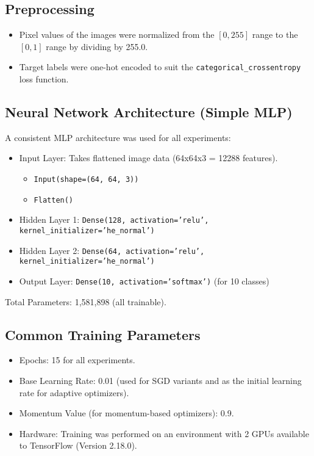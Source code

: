 \documentclass[11pt,a4paper]{article}
\begin{document}
\subsection{Preprocessing}
\begin{itemize}
    \item Pixel values of the images were normalized from the $[0, 255]$ range to the $[0, 1]$ range by dividing by 255.0.
    \item Target labels were one-hot encoded to suit the \texttt{categorical\_crossentropy} loss function.
\end{itemize}

\subsection{Neural Network Architecture (Simple MLP)}
A consistent MLP architecture was used for all experiments:
\begin{itemize}
    \item Input Layer: Takes flattened image data (64x64x3 = 12288 features).
        \begin{itemize}
            \item \texttt{Input(shape=(64, 64, 3))}
            \item \texttt{Flatten()}
        \end{itemize}
    \item Hidden Layer 1: \texttt{Dense(128, activation='relu', kernel\_initializer='he\_normal')}
    \item Hidden Layer 2: \texttt{Dense(64, activation='relu', kernel\_initializer='he\_normal')}
    \item Output Layer: \texttt{Dense(10, activation='softmax')} (for 10 classes)
\end{itemize}
Total Parameters: 1,581,898 (all trainable).

\subsection{Common Training Parameters}
\begin{itemize}
    \item Epochs: 15 for all experiments.
    \item Base Learning Rate: 0.01 (used for SGD variants and as the initial learning rate for adaptive optimizers).
    \item Momentum Value (for momentum-based optimizers): 0.9.
    \item Hardware: Training was performed on an environment with 2 GPUs available to TensorFlow (Version 2.18.0).
\end{itemize}
\end{document}
